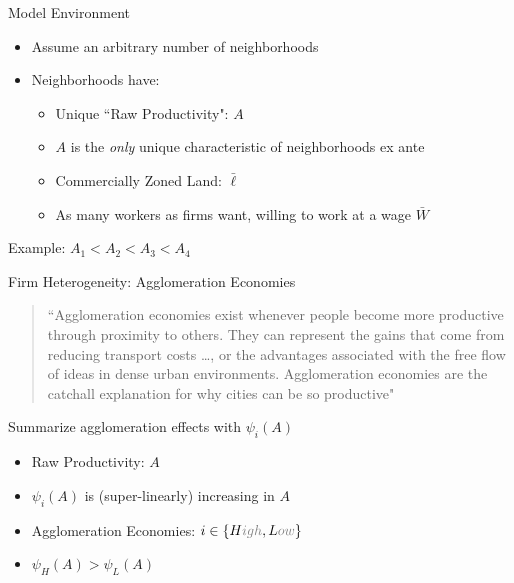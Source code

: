 \documentclass[11pt, dvipsnames, usenames]{beamer}
\begin{document}
\begin{frame}{Model Environment}

\begin{itemize}
\item Assume an arbitrary number of neighborhoods
\item Neighborhoods have:
\begin{itemize}
	\item Unique ``Raw Productivity": $A$
	\item $A$ is the \emph{only} unique characteristic of neighborhoods ex ante
	\item Commercially Zoned Land: $\bar{\ell}$
	\item As many workers as firms want, willing to work at a wage $\bar{W}$
\end{itemize}
\end{itemize}


\vfill
Example: $A_1 < A_2 < A_3 < A_4$

\bigskip
\centering
{}


\end{frame}



\begin{frame}{Firm Heterogeneity: Agglomeration Economies}

\begin{quote}
\small ``Agglomeration economies exist whenever people become more productive through proximity to others. They can represent the gains that come from reducing transport costs \ldots, or the \textcolor{EAPred}{advantages associated with the free flow of ideas in dense urban environments.} Agglomeration economies are the catchall explanation for why cities can be so productive" \citep{glaeser2008cities}
\end{quote}

\vfill
Summarize agglomeration effects with $\psi_i (A)$
\begin{itemize}
\item Raw Productivity: $A$
\item $\psi_i(A)$ is (super-linearly) increasing in $A$ \citep{gaubert2018firm}
\item Agglomeration Economies: $i \in \{H\textcolor{gray}{igh}, L\textcolor{gray}{ow}\}$
\item $\psi_H(A) > \psi_L(A)$
\end{itemize}

\end{frame}
\end{document}

